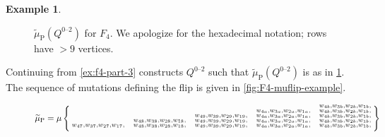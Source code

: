 \documentclass{amsart}
\theoremstyle{plain}
\theoremstyle{definition}
\newtheorem{example}[theorem]{Example}
\theoremstyle{remark}
\newcommand{\Qdv}{Q^{0\text{--}2}}
\newcommand{\muint}[1]{\widetilde{\mu}_{\text{#1}}}
\newcommand{\muP}{\muint{P}}
\begin{document}
  \begin{example}
    \label{ex:f4-part-4}

    \begin{figure}
      \centering 

      \caption{$\muP(\Qdv)$ for $F_4$. We apologize for the hexadecimal
        notation; rows have $>9$ vertices.
        \label{fig:Q0-2F4}
      }
    \end{figure}

    Continuing from \cref{ex:f4-part-3} constructs $\Qdv$ such that
    $\muP(\Qdv)$ is as in \cref{fig:Q0-2F4}. The sequence of mutations
    defining the flip is given in \cref{fig:F4-muflip-example}.

    \begin{figure}[h]
      \begin{align*}
        \muP &= \mu\Set{
          \begin{subarray}{l}
\phantom{
         w_{47}, w_{37}, w_{27}, w_{17}, \quad
         w_{48}, w_{38}, w_{28}, w_{18}, \quad
         w_{49}, w_{39}, w_{29}, w_{19}, \quad
         w_{4a}, w_{3a}, w_{2a}, w_{1a}, \quad
}
         w_{4b}, w_{3b}, w_{2b}, w_{1b}, \\
\phantom{
         w_{47}, w_{37}, w_{27}, w_{17}, \quad
         w_{48}, w_{38}, w_{28}, w_{18}, \quad
         w_{49}, w_{39}, w_{29}, w_{19}, \quad
}
         w_{4a}, w_{3a}, w_{2a}, w_{1a}, \quad
         w_{4b}, w_{3b}, w_{2b}, w_{1b}, \\
\phantom{
         w_{47}, w_{37}, w_{27}, w_{17}, \quad
         w_{48}, w_{38}, w_{28}, w_{18}, \quad
}
         w_{49}, w_{39}, w_{29}, w_{19}, \quad
         w_{4a}, w_{3a}, w_{2a}, w_{1a}, \quad
         w_{4b}, w_{3b}, w_{2b}, w_{1b}, \\
\phantom{
         w_{47}, w_{37}, w_{27}, w_{17}, \quad
}
         w_{48}, w_{38}, w_{28}, w_{18}, \quad
         w_{49}, w_{39}, w_{29}, w_{19}, \quad
         w_{4a}, w_{3a}, w_{2a}, w_{1a}, \quad
         w_{4b}, w_{3b}, w_{2b}, w_{1b}, \\
\phantom{
}
         w_{47}, w_{37}, w_{27}, w_{17}, \quad
         w_{48}, w_{38}, w_{28}, w_{18}, \quad
         w_{49}, w_{39}, w_{29}, w_{19}, \quad
         w_{4a}, w_{3a}, w_{2a}, w_{1a}, \quad
         w_{4b}, w_{3b}, w_{2b}, w_{1b}, \\
\phantom{
         w_{41}, w_{31}, w_{21}, w_{11}, \quad
         w_{42}, w_{32}, w_{22}, w_{12}, \quad
         w_{43}, w_{33}, w_{23}, w_{13}, \quad
         w_{44}, w_{34}, w_{24}, w_{14}, \quad
}
\end{subarray}}
\end{align*}
\end{figure}
\end{example}
\end{document}

